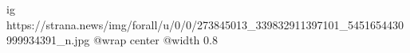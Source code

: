  
 
 
 
 

\ifcmt
  ig https://strana.news/img/forall/u/0/0/273845013_339832911397101_5451654430999934391_n.jpg
  @wrap center
  @width 0.8
\fi
